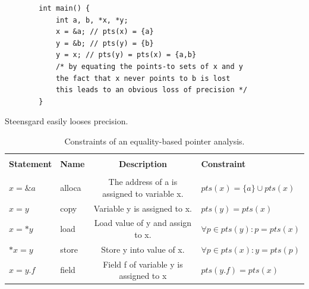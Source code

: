 \begin{listing}
    \begin{verbatim}
        int main() {
            int a, b, *x, *y;
            x = &a; // pts(x) = {a}
            y = &b; // pts(y) = {b}
            y = x; // pts(y) = pts(x) = {a,b}
            /* by equating the points-to sets of x and y
            the fact that x never points to b is lost
            this leads to an obvious loss of precision */
        }
    \end{verbatim}
    \caption{Steensgard easily looses precision.}
    \label{lst:steensvander}
\end{listing}

\begin{table}
    \begin{center}
        \caption{Constraints of an equality-based pointer analysis.}
        \label{tab:steens}
        \begin{tabular}{l|l|c|l}
            \hline                                                                                                                 \\
            \textbf{Statement} & \textbf{Name} & \textbf{Description}                        & \textbf{Constraint}                 \\
            \hline                                                                                                                 \\
            $x = \&a$          & alloca        & The address of a is assigned to variable x. & $pts(x) = \{a\} \cup pts(x)$        \\
            $x = y$            & copy          & Variable y is assigned to x.                & $pts(y) = pts(x)$                   \\
            $x = *y$           & load          & Load value of y and assign to x.            & $\forall p \in pts(y) \colon p = pts(x)$ \\
            $*x = y$           & store         & Store y into value of x.                    & $\forall p \in pts(x) \colon y = pts(p)$ \\
            $x = y.f$          & field         & Field f of variable y is assigned to x      & $pts(y.f) = pts(x)$                 \\
        \end{tabular}
    \end{center}
\end{table}

